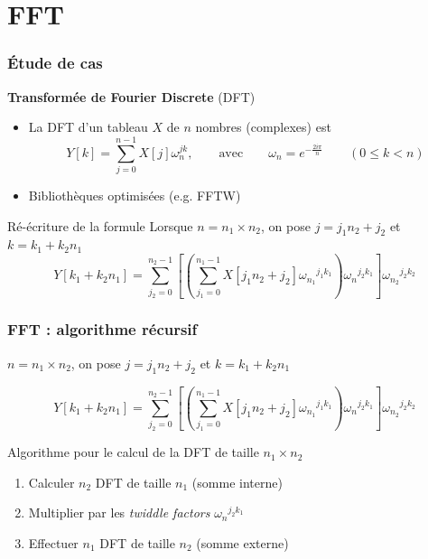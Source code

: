 \documentclass[xcolor={x11names,svgnames}]{beamer}
\begin{document}

\section{FFT}

\begin{frame}
  \frametitle{Étude de cas}

  \begin{block}{\textbf{Transformée de Fourier Discrete} (DFT)}
  \begin{itemize}
  \item La DFT d'un tableau $X$ de $n$ nombres (complexes) est
\[
  Y[k] = \sum_{j=0}^{n-1} X[j] \omega_n^{jk}, \qquad \text{avec} \qquad \omega_n = e^{-\frac{2i\pi}{n}} \qquad (0 \leq k < n)
\]
\item Bibliothèques optimisées (e.g. FFTW)
\end{itemize}
\end{block}

\medskip

\begin{alertblock}{Ré-écriture de la formule}
Lorsque $n = n_1 \times n_2$, on pose
$j = j_1 n_2 + j_2$ et $k = k_1 + k_2 n_1$ 
\[
Y[k_1 + k_2 n_1] = \sum_{j_2 = 0}^{n_2 - 1} \left[ \left( \sum_{j_1 = 0}^{n_1 - 1} X[j_1n_2 + j_2] {\omega_{n_1}}^{j_1 k_1} \right) {\omega_n}^{j_2 k_1} \right] {\omega_{n_2}}^{j_2 k_2}
\]
\end{alertblock}

\end{frame}


\begin{frame}
  \frametitle{FFT : algorithme récursif}

$n = n_1 \times n_2$, on pose $j = j_1 n_2 + j_2$ et $k = k_1 + k_2 n_1$ 

\[
Y[k_1 + k_2 n_1] = \sum_{j_2 = 0}^{n_2 - 1} \left[ \left( \sum_{j_1 = 0}^{n_1 - 1} X[j_1n_2 + j_2] {\omega_{n_1}}^{j_1 k_1} \right) {\omega_n}^{j_2 k_1} \right] {\omega_{n_2}}^{j_2 k_2}
\]
  
\begin{block}{Algorithme pour le calcul de la DFT de taille $n_1 \times n_2$}
  \begin{enumerate}
  \item Calculer $n_2$ DFT de taille $n_1$ (somme interne)
  \item Multiplier par les \emph{twiddle factors} ${\omega_n}^{j_2 k_1}$
  \item Effectuer $n_1$ DFT de taille $n_2$ (somme externe)
  \end{enumerate}
\end{block}

\end{frame}
\end{document}
